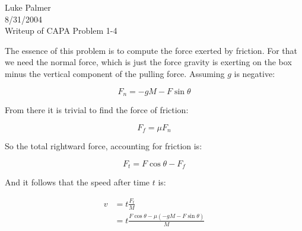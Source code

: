 \documentclass[12pt]{article}
\begin{document}
\noindent
Luke Palmer                 \\
8/31/2004                   \\
Writeup of CAPA Problem 1-4


The essence of this problem is to compute the force exerted by friction.  For
that we need the normal force, which is just the force gravity is exerting
on the box minus the vertical component of the pulling force.  Assuming $g$ 
is negative:

\[
    F_n = -g M - F \sin{\theta}
\]

From there it is trivial to find the force of friction:

\[
    F_f = \mu F_n
\]

So the total rightward force, accounting for friction is:

\[
    F_t = F \cos{\theta} - F_f
\]

And it follows that the speed after time $t$ is:

\begin{align*}
    v &= t \frac{F_t}{M} \\
      &= t \frac{F \cos{\theta} - \mu (-g M - F \sin{\theta})}{M}
\end{align*}
\end{document}
